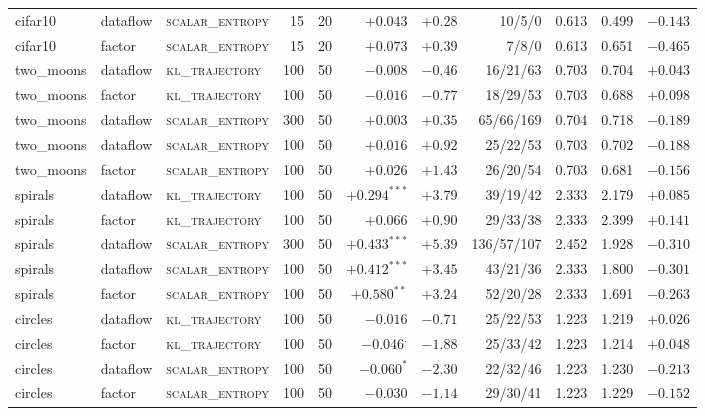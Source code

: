 \documentclass[11pt,a4paper]{article}
\newcommand{\scalarH}{\textsc{scalar\_entropy}\xspace}
\newcommand{\klT}{\textsc{kl\_trajectory}\xspace}
\begin{document}
\begin{footnotesize}
\begin{longtable}{@{}lllrrrrrrrr@{}}
cifar10            & dataflow & \scalarH & 15 & 20 & $+0.043$       & $+0.28$ & 10/5/0   & 0.613 & 0.499 & $-0.143$ \\
cifar10            & factor   & \scalarH & 15 & 20 & $+0.073$       & $+0.39$ &  7/8/0   & 0.613 & 0.651 & $-0.465$ \\
\midrule
two\_moons         & dataflow & \klT     & 100 & 50 & $-0.008$      & $-0.46$ & 16/21/63 & 0.703 & 0.704 & $+0.043$ \\
two\_moons         & factor   & \klT     & 100 & 50 & $-0.016$      & $-0.77$ & 18/29/53 & 0.703 & 0.688 & $+0.098$ \\
two\_moons         & dataflow & \scalarH & 300 & 50 & $+0.003$      & $+0.35$ & 65/66/169 & 0.704 & 0.718 & $-0.189$ \\
two\_moons         & dataflow & \scalarH & 100 & 50 & $+0.016$      & $+0.92$ & 25/22/53 & 0.703 & 0.702 & $-0.188$ \\
two\_moons         & factor   & \scalarH & 100 & 50 & $+0.026$      & $+1.43$ & 26/20/54 & 0.703 & 0.681 & $-0.156$ \\
\midrule
spirals            & dataflow & \klT     & 100 & 50 & $+0.294^{***}$& $+3.79$ & 39/19/42 & 2.333 & 2.179 & $+0.085$ \\
spirals            & factor   & \klT     & 100 & 50 & $+0.066$      & $+0.90$ & 29/33/38 & 2.333 & 2.399 & $+0.141$ \\
spirals            & dataflow & \scalarH & 300 & 50 & $+0.433^{***}$& $+5.39$ &136/57/107 & 2.452 & 1.928 & $-0.310$ \\
spirals            & dataflow & \scalarH & 100 & 50 & $+0.412^{***}$& $+3.45$ & 43/21/36 & 2.333 & 1.800 & $-0.301$ \\
spirals            & factor   & \scalarH & 100 & 50 & $+0.580^{**}$ & $+3.24$ & 52/20/28 & 2.333 & 1.691 & $-0.263$ \\
\midrule
circles            & dataflow & \klT     & 100 & 50 & $-0.016$      & $-0.71$ & 25/22/53 & 1.223 & 1.219 & $+0.026$ \\
circles            & factor   & \klT     & 100 & 50 & $-0.046^{.}$  & $-1.88$ & 25/33/42 & 1.223 & 1.214 & $+0.048$ \\
circles            & dataflow & \scalarH & 100 & 50 & $-0.060^{*}$  & $-2.30$ & 22/32/46 & 1.223 & 1.230 & $-0.213$ \\
circles            & factor   & \scalarH & 100 & 50 & $-0.030$      & $-1.14$ & 29/30/41 & 1.223 & 1.229 & $-0.152$ \\
\end{longtable}
\end{footnotesize}
\end{document}
